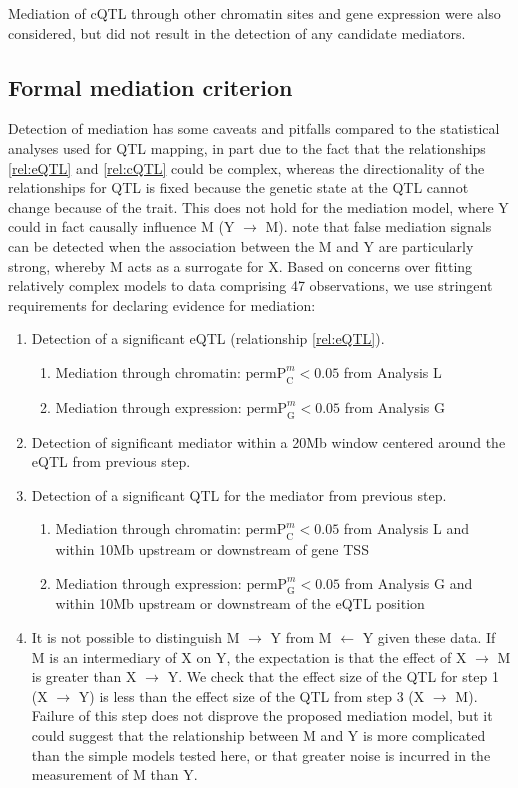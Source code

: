 \documentclass[10pt,letterpaper,twoside]{article}
\newcommand{\permpmed}{\text{permP}^{m}}
\begin{document}
Mediation of cQTL through other chromatin sites and gene expression were also considered, but did not result in the detection of any candidate mediators.

\subsection*{Formal mediation criterion}

Detection of mediation has some caveats and pitfalls compared to the statistical analyses used for QTL mapping, in part due to the fact that the relationships \ref{rel:eQTL} and \ref{rel:cQTL} could be complex, whereas the directionality of the relationships for QTL is fixed because the genetic state at the QTL cannot change because of the trait. This does not hold for the mediation model, where Y could in fact causally influence M (Y $\rightarrow$ M). \cite{Didelez2007} note that false mediation signals can be detected when the association between the M and Y are particularly strong, whereby M acts as a surrogate for X. Based on concerns over fitting relatively complex models to data comprising 47 observations, we use stringent requirements for declaring evidence for mediation:
\begin{enumerate}
	\item Detection of a significant eQTL (relationship \ref{rel:eQTL}).
    \begin{enumerate}
    	\item Mediation through chromatin: $\permpmed_{\text{C}} < 0.05$ from Analysis L
        \item Mediation through expression: $\permpmed_{\text{G}} < 0.05$ from Analysis G
    \end{enumerate}
    \item Detection of significant mediator within a 20Mb window centered around the eQTL from previous step.
    \item Detection of a significant QTL for the mediator from previous step.
    \begin{enumerate}
    	\item Mediation through chromatin: $\permpmed_{\text{C}} < 0.05$ from Analysis L and within 10Mb upstream or downstream of gene TSS
        \item Mediation through expression: $\permpmed_{\text{G}} < 0.05$ from Analysis G and within 10Mb upstream or downstream of the eQTL position
    \end{enumerate}
    \item It is not possible to distinguish M $\rightarrow$ Y from M $\leftarrow$ Y given these data. If M is an intermediary of X on Y, the expectation is that the effect of X $\rightarrow$ M is greater than X $\rightarrow$ Y. We check that the effect size of the QTL for step 1 (X $\rightarrow$ Y) is less than the effect size of the QTL from step 3 (X $\rightarrow$ M). Failure of this step does not disprove the proposed mediation model, but it could suggest that the relationship between M and Y is more complicated than the simple models tested here, or that greater noise is incurred in the measurement of M than Y.
\end{enumerate}
\end{document}
